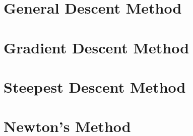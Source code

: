 \begin{example}

\end{example}

\begin{example}

\end{example}

\section{General Descent Method}

\section{Gradient Descent Method}

\section{Steepest Descent Method}

\section{Newton's Method}